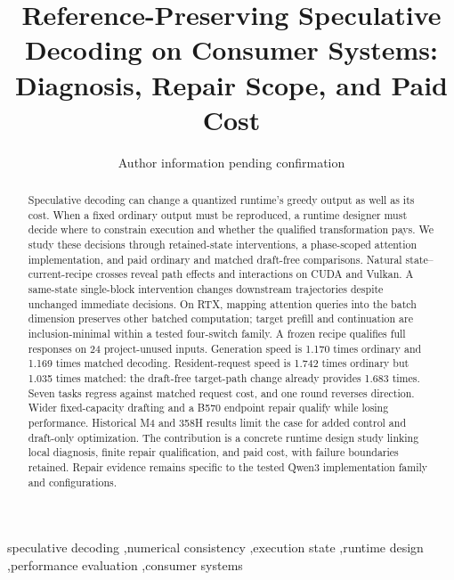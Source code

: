 \documentclass[final,5p,times,twocolumn]{elsarticle}
\begin{document}
\begin{frontmatter}
\title{Reference-Preserving Speculative Decoding on Consumer Systems: Diagnosis, Repair Scope, and Paid Cost}
\author{Author information pending confirmation}
\begin{abstract}
Speculative decoding can change a quantized runtime's greedy output as well as its cost. When a fixed ordinary output must be reproduced, a runtime designer must decide where to constrain execution and whether the qualified transformation pays. We study these decisions through retained-state interventions, a phase-scoped attention implementation, and paid ordinary and matched draft-free comparisons. Natural state--current-recipe crosses reveal path effects and interactions on CUDA and Vulkan. A same-state single-block intervention changes downstream trajectories despite unchanged immediate decisions. On RTX, mapping attention queries into the batch dimension preserves other batched computation; target prefill and continuation are inclusion-minimal within a tested four-switch family. A frozen recipe qualifies full responses on 24 project-unused inputs. Generation speed is 1.170 times ordinary and 1.169 times matched decoding. Resident-request speed is 1.742 times ordinary but 1.035 times matched: the draft-free target-path change already provides 1.683 times. Seven tasks regress against matched request cost, and one round reverses direction. Wider fixed-capacity drafting and a B570 endpoint repair qualify while losing performance. Historical M4 and 358H results limit the case for added control and draft-only optimization. The contribution is a concrete runtime design study linking local diagnosis, finite repair qualification, and paid cost, with failure boundaries retained. Repair evidence remains specific to the tested Qwen3 implementation family and configurations.
\end{abstract}
\begin{keyword}
speculative decoding \sep numerical consistency \sep execution state \sep runtime design \sep performance evaluation \sep consumer systems
\end{keyword}
\end{frontmatter}











\end{document}
